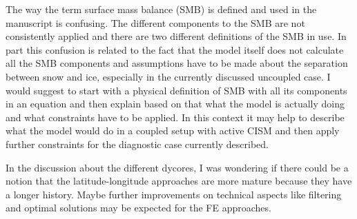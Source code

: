 \documentclass[12pt,oneside,a4paper]{article}%
\begin{document}
{\color{blue}{We have added a subsection on computational costs to address the reviewers concern, in the methods section.}} \newline

The way the term surface mass balance (SMB) is defined and used in the manuscript is confusing. The different components to the SMB are not consistently applied and there are two different definitions of the SMB in use. In part this confusion is related to the fact that the model itself does not calculate all the SMB components and assumptions have to be made about the separation between snow and ice, especially in the currently discussed uncoupled case. I would suggest to start with a physical definition of SMB with all its components in an equation and then explain based on that what the model is actually doing and what constraints have to be applied. In this context it may help to describe what the model would do in a coupled setup with active CISM and then apply further constraints for the diagnostic case currently described. \newline

{\color{blue}{We thanks the reviewer for bringing this to our attention, and agree that our constant referencing of what the SMB refers to has led to some inconsistent definitions and confusion in the text. We have (1) removed attempts (other than very generally) to define the SMB (and the ablation zone) in parenthesis after introducing these terms in the introduction, (2) clarified the description of the SMB that is computed in CESM (the section ``Simulated surface mass balance"), and (3) made clear in the ``SMB analysis" section that the SMB equation we are computing in this paper is different from that computed by CESM.}} \newline

In the discussion about the different dycores, I was wondering if there could be a notion that the latitude-longitude approaches are more mature because they have a longer history. Maybe further improvements on technical aspects like filtering and optimal solutions may be expected for the FE approaches. \newline

{\color{blue}{This is a good point. A case in point would be the improvements to the flow over topography going from CESM2.0 to CESM2.2. We are still developing CAM-SE. We have elaborated on this point in the methods section (where we point to the CESM2.2 enhancements in the Appendix) and the conclusions section, the second to last paragraph.}} \newline
\end{document}
